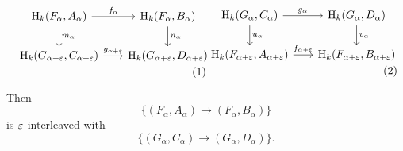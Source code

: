 \begin{lemma}
  \vspace{3ex}\begin{subequations}
  \begin{minipage}{0.5\textwidth}\begin{equation}\label{dgm:fabgcd}
  \begin{tikzcd}[column sep=scriptsize]
    \hom_k(F_\alpha, A_\alpha)\arrow{r}{f_\alpha}\arrow{d}{m_{\alpha}} &
    \hom_k(F_\alpha, B_\alpha)\arrow{d}{n_\alpha}\\
    \hom_k(G_{\alpha+\e}, C_{\alpha+\e})\arrow{r}{g_{\alpha+\e}} &
    \hom_k(G_{\alpha+\e}, D_{\alpha+\e})
  \end{tikzcd}\end{equation}\end{minipage}
  \begin{minipage}{0.5\textwidth}\begin{equation}\label{dgm:gcdfab}
  \begin{tikzcd}[column sep=scriptsize]
    \hom_k(G_\alpha, C_\alpha)\arrow{r}{g_\alpha}\arrow{d}{u_\alpha} &
    \hom_k(G_\alpha, D_\alpha)\arrow{d}{v_\alpha}\\
    \hom_k(F_{\alpha+\e}, A_{\alpha+\e})\arrow{r}{f_{\alpha+\e}} &
    \hom_k(F_{\alpha+\e}, B_{\alpha+\e})
  \end{tikzcd}\end{equation}\end{minipage}
  \end{subequations}\vspace{3ex}

  \noindent Then
  \[ \{(F_\alpha, A_\alpha)\to (F_\alpha, B_\alpha)\}\]
  is $\varepsilon$-interleaved with
  \[\{(G_\alpha, C_\alpha)\to (G_\alpha, D_\alpha)\}.\]

\end{lemma}
